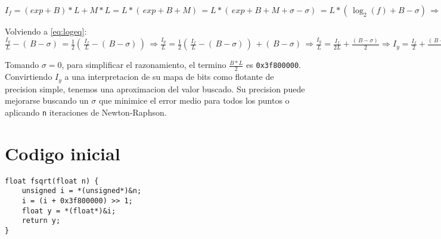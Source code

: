 \documentclass[]{article}
\begin{document}
\(I_f = (exp + B)*L + M*L = L*(\,exp+B+M)\,=L*(\,exp+B+M+\sigma-\sigma)\,=L*(\,\log_2(f)+B-\sigma)\,\Rightarrow\frac{I_f}{L}-(\,B-\sigma)\,=\log_2(f)\)

Volviendo a \eqref{eq:logeq}: \(\frac{I_y}{L}-(\,B-\sigma)\,=\frac{1}{2}(\, \frac{I_f}{L}-(\,B-\sigma)\,)\,\Rightarrow \frac{I_y}{L}=\frac{1}{2}(\,\frac{I_f}{L}-(\,B-\sigma)\,)\,+(\,B-\sigma)\,\Rightarrow  \frac{I_y}{L}=\frac{I_f}{2L}+\frac{(\,B-\sigma)\,}{2}\Rightarrow  I_y=\frac{I_f}{2}+\frac{(\,B-\sigma)\,*L}{2}\)

Tomando \(\sigma=0\), para simplificar el razonamiento, el termino \(\frac{B*L}{2}\) es \verb|0x3f800000|. Convirtiendo \(I_y\) a una interpretacion de su mapa de bits como flotante de precision simple, tenemos una aproximacion del valor buscado. Su precision puede mejorarse buscando un \(\sigma\) que minimice el error medio para todos los puntos o aplicando \verb|n| iteraciones de Newton-Raphson.
	
\section{Codigo inicial}
\begin{lstlisting}
float fsqrt(float n) {
	unsigned i = *(unsigned*)&n;
	i = (i + 0x3f800000) >> 1;
	float y = *(float*)&i;  
	return y;
}
\end{lstlisting}
	
	
\end{document}
